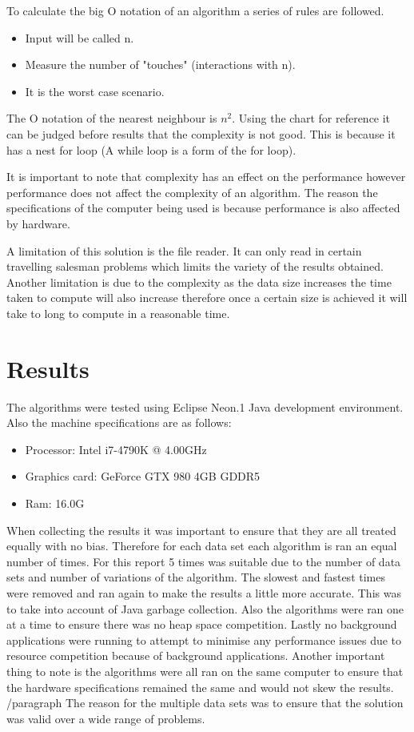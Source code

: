 \documentclass[conference,backref=page]{acmsiggraph}
\begin{document}
To calculate the big O notation of an algorithm a series of rules are followed.
\begin{itemize}
	\item Input will be called n.
	\item Measure the number of "touches" (interactions with n).
	\item It is the worst case scenario.
	
\end{itemize}

The O notation of the nearest neighbour is \begin{math}{n^2} \end{math}. Using the chart for reference it can be judged before results that the complexity is not good. This is because it has a nest for loop (A while loop is a form of the for loop).



It is important to note that complexity has an effect on the performance however performance does not affect the complexity of an algorithm. The reason the specifications of the computer being used is because performance is also affected by hardware.

A limitation of this solution is the file reader. It can only read in certain travelling salesman problems which limits the variety of the results obtained. Another limitation is due to the complexity as the data size increases the time taken to compute will also increase therefore once a certain size is achieved it will take to long to compute in a reasonable time.
\section{Results}

The algorithms were tested using Eclipse Neon.1 Java development environment. Also the machine specifications are as follows:
\begin{itemize}
\item Processor:	Intel i7-4790K @ 4.00GHz
\item Graphics card:	GeForce GTX 980	4GB GDDR5
\item Ram:	16.0G

\end{itemize}

When collecting the results it was important to ensure that they are all treated equally with no bias. Therefore for each data set each algorithm is ran an equal number of times. For this report 5 times was suitable due to the number of data sets and number of variations of the algorithm. The slowest and fastest times were removed and ran again to make the results a little more accurate. This was to take into account of Java garbage collection. Also the algorithms were ran one at a time to ensure there was no heap space competition. Lastly no background applications were running to attempt to minimise any performance issues due to resource competition because of background applications. Another important thing to note is the algorithms were all ran on the same computer to ensure that the hardware specifications remained the same and would not skew the results.
/paragraph{}
The reason for the multiple data sets was to ensure that the solution was valid over a wide range of problems.
\end{document}
